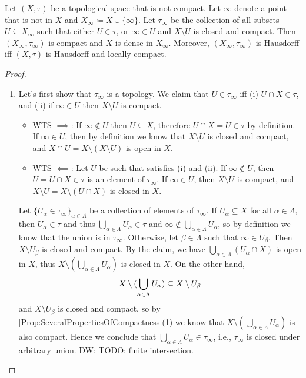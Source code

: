 \documentclass[screen,single]{techreport}
\numberwithin{equation}{section}
\newcommand{\diw}[1]{{\color{Red} DW: #1}}
\begin{document}
\begin{theorem}\label{The:AlexandroffCompactification}
	Let $(X,\tau)$ be a topological space that is not compact.
	Let $\infty$ denote a point that is not in $X$ and $X_\infty \coloneqq X \cup \{\infty\}$.
	Let $\tau_\infty$ be the collection of all subsets $U \subseteq X_\infty$ such that either $U \in \tau$, or $\infty \in U$ and $X \setminus U$ is closed and compact.
	Then $(X_\infty,\tau_\infty)$ is compact and $X$ is dense in $X_\infty$.
	Moreover, $(X_\infty,\tau_\infty)$ is Hausdorff iff $(X,\tau)$ is Hausdorff and locally compact.
\end{theorem}
\begin{proof}\
	\begin{enumerate}
		\item Let's first show that $\tau_\infty$ is a topology.
		We claim that $U \in \tau_\infty$ iff (i) $U \cap X \in \tau$, and (ii) if $\infty \in U$ then $X \setminus U$ is compact.
		\begin{itemize}
			\item WTS ${\implies}$: If $\infty \not\in U$ then $U \subseteq X$, therefore $U \cap X = U \in \tau$ by definition.
			If $\infty \in U$, then by definition we know that $X \setminus U$ is closed and compact, and $X \cap U = X \setminus (X \setminus U)$ is open in $X$.
			\item WTS $\impliedby$: Let $U$ be such that satisfies (i) and (ii).
			If $\infty \not\in U$, then $U = U \cap X \in \tau$ is an element of $\tau_\infty$.
			If $\infty \in U$, then $X \setminus U$ is compact, and $X \setminus U = X \setminus (U \cap X)$ is closed in $X$.
		\end{itemize}
		Let $\{ U_\alpha \in \tau_\infty\}_{\alpha \in \Lambda}$ be a collection of elements of $\tau_\infty$.
		If $U_\alpha \subseteq X$ for all $\alpha \in \Lambda$, then $U_\alpha \in \tau$ and thus $\bigcup_{\alpha \in \Lambda} U_\alpha \in \tau$ and $\infty \not\in \bigcup_{\alpha \in \Lambda} U_\alpha$, so by definition we know that the union is in $\tau_\infty$.
		Otherwise, let $\beta \in \Lambda$ such that $\infty \in U_\beta$.
		Then $X \setminus U_\beta$ is closed and compact.
		By the claim, we have $\bigcup_{\alpha \in \Lambda} (U_\alpha \cap X)$ is open in $X$, thus $X \setminus (\bigcup_{\alpha \in \Lambda} U_\alpha)$ is closed in $X$.
		On the other hand,
		\[
		X \setminus ({\bigcup_{\alpha \in \Lambda} U_\alpha}) \subseteq X \setminus U_\beta
		\]
		and $X \setminus U_\beta$ is closed and compact, so by \cref{Prop:SeveralPropertiesOfCompactness}(1) we know that $X \setminus (\bigcup_{\alpha \in \Lambda} U_\alpha)$ is also compact.
		Hence we conclude that $\bigcup_{\alpha \in \Lambda} U_\alpha \in \tau_\infty$, i.e., $\tau_\infty$ is closed under arbitrary union.
		\diw{TODO: finite intersection.}
		

\end{enumerate}
\end{proof}
\end{document}
